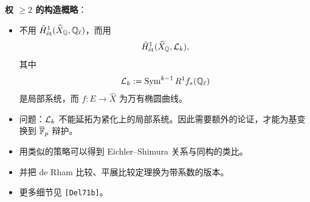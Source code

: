 \noindent\textbf{权 $\ge2$ 的构造概略}：
\begin{itemize}
\item 不用 $\tilde H^1_{\mathrm{\acute{e}t}}(\widehat X_{\mathbb{Q}},\mathbb{Q}_\ell)$，而用
\[
\tilde H^1_{\mathrm{\acute{e}t}}(\widehat X_{\mathbb{Q}},\mathcal{L}_k),
\]
其中
\[
\mathcal{L}_k:=\operatorname{Sym}^{k-1}R^1f_*(\mathbb{Q}_\ell)
\]
是局部系统，而
$f\colon E\to\widehat X$ 为万有椭圆曲线。
\item 问题：$\mathcal{L}_k$ 不能延拓为紧化上的局部系统。因此需要额外的论证，才能为基变换到 $\overline{\mathbb{F}}_p$ 辩护。
\item 用类似的策略可以得到 Eichler--Shimura 关系与同构的类比。
\item 并把 de Rham 比较、平展比较定理换为带系数的版本。
\item 更多细节见 \texttt{[Del71b]}。
\end{itemize}
